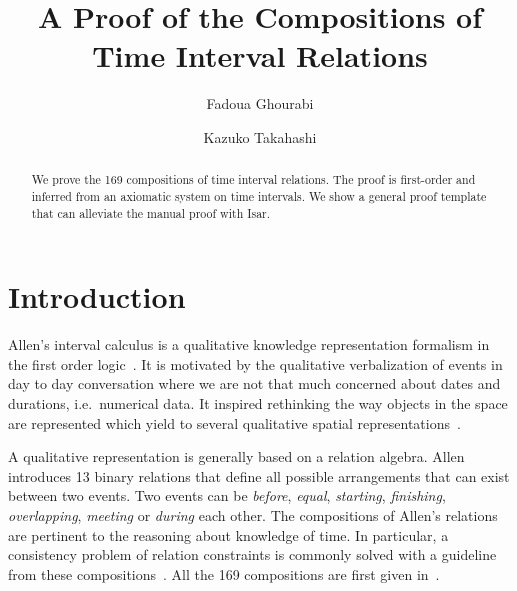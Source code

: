 \documentclass{llncs}
\title{A Proof of the Compositions of \\Time Interval Relations}
\author{
Fadoua Ghourabi\inst{1}
\and
    Kazuko Takahashi\inst{2}}
\institute{
  Ochanomizu University,
  Tokyo, Japan\\
  \email{ghourabi.fadoua@ocha.ac.jp}
\and
   Kwansei Gakuin University,
   Sanda, Japan.\\
   \email{ktaka@kwansei.ac.jp}
 }
\begin{document}
\maketitle

\begin{abstract}
We prove  the 169 compositions of time interval relations. The proof is first-order and inferred from an axiomatic system on time intervals. We show a general proof template that can  alleviate the manual proof with Isar. %
 \end{abstract}

\section{Introduction}
Allen's interval calculus is a qualitative knowledge representation formalism in the first order logic~\cite{Allen:1983,Allen:1985}. It is motivated by the qualitative verbalization of events in day to day conversation where we are not that much concerned about  dates and durations, i.e.~numerical data. It inspired rethinking the way objects in the space are represented which yield to several qualitative spatial representations~\cite{Randell:1992a,Frank:1991}. 

A qualitative representation is generally based on a relation algebra. Allen introduces 13 binary relations that define all possible arrangements that can exist between two events. Two events can be \textit{before}, \textit{equal}, \textit{starting}, \textit{finishing}, \textit{overlapping}, \textit{meeting} or \textit{during} each other.  %
The compositions of Allen's relations are pertinent to the reasoning about knowledge of time. In particular, a consistency problem of relation constraints is commonly solved with a guideline from these compositions~\cite{Ladkin:1992}. %
All the 169 compositions are first given in~\cite{Allen:1983}. %
\end{document}
